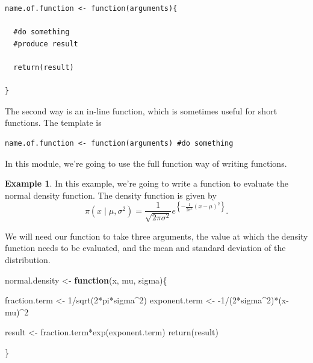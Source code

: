\documentclass[
]{book}
\newenvironment{Shaded}{\begin{snugshade}}{\end{snugshade}}
\newcommand{\ControlFlowTok}[1]{\textcolor[rgb]{0.13,0.29,0.53}{\textbf{#1}}}
\newcommand{\DecValTok}[1]{\textcolor[rgb]{0.00,0.00,0.81}{#1}}
\newcommand{\FunctionTok}[1]{\textcolor[rgb]{0.00,0.00,0.00}{#1}}
\newcommand{\NormalTok}[1]{#1}
\newcommand{\OtherTok}[1]{\textcolor[rgb]{0.56,0.35,0.01}{#1}}
\newcommand{\SpecialCharTok}[1]{\textcolor[rgb]{0.00,0.00,0.00}{#1}}
\theoremstyle{definition}
\theoremstyle{definition}
\newtheorem{example}{Example}[chapter]
\theoremstyle{definition}
\theoremstyle{definition}
\theoremstyle{remark}
\begin{document}
\begin{verbatim}
name.of.function <- function(arguments){

  #do something
  #produce result
  
  return(result)

}
\end{verbatim}

The second way is an in-line function, which is sometimes useful for short functions. The template is

\begin{verbatim}
name.of.function <- function(arguments) #do something
\end{verbatim}

In this module, we're going to use the full function way of writing functions.

\begin{example}
In this example, we're going to write a function to evaluate the normal density function. The density function is given by
\[
\pi(x \mid \mu, \sigma^2) = \frac{1}{\sqrt{2\pi\sigma^2}}e^{\left\{-\frac{1}{2\sigma^2}(x-\mu)^2\right\}}.
\]

We will need our function to take three arguments, the value at which the density function needs to be evaluated, and the mean and standard deviation of the distribution.

\begin{Shaded}
\begin{Highlighting}[]
\NormalTok{normal.density }\OtherTok{\textless{}{-}} \ControlFlowTok{function}\NormalTok{(x, mu, sigma)\{}
  
\NormalTok{  fraction.term }\OtherTok{\textless{}{-}} \DecValTok{1}\SpecialCharTok{/}\FunctionTok{sqrt}\NormalTok{(}\DecValTok{2}\SpecialCharTok{*}\NormalTok{pi}\SpecialCharTok{*}\NormalTok{sigma}\SpecialCharTok{\^{}}\DecValTok{2}\NormalTok{)}
\NormalTok{  exponent.term }\OtherTok{\textless{}{-}} \SpecialCharTok{{-}}\DecValTok{1}\SpecialCharTok{/}\NormalTok{(}\DecValTok{2}\SpecialCharTok{*}\NormalTok{sigma}\SpecialCharTok{\^{}}\DecValTok{2}\NormalTok{)}\SpecialCharTok{*}\NormalTok{(x}\SpecialCharTok{{-}}\NormalTok{mu)}\SpecialCharTok{\^{}}\DecValTok{2}
  
\NormalTok{  result }\OtherTok{\textless{}{-}}\NormalTok{ fraction.term}\SpecialCharTok{*}\FunctionTok{exp}\NormalTok{(exponent.term)}
  \FunctionTok{return}\NormalTok{(result)}
  
\NormalTok{\}}
\end{Highlighting}
\end{Shaded}


\end{example}
\end{document}

